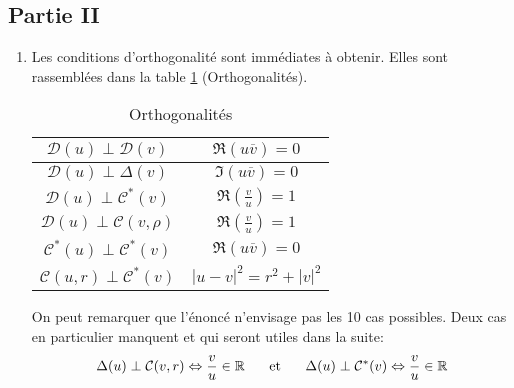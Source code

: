 \subsection*{Partie II}
\begin{enumerate}
 \item Les conditions d'orthogonalité sont immédiates à obtenir. Elles sont rassemblées dans la table \ref{tab:orthog} (Orthogonalités).
\begin{table}[h]
 \centering
 \renewcommand{\arraystretch}{2.2}
 \begin{tabular}{|c|c|}
\hline
 $\mathcal D(u) \perp \mathcal D(v)$      & $\Re\left(u\overline{v}\right)=0$ \\ \hline
 $\mathcal D(u) \perp \Delta(v)$          & $\Im \left( u\overline{v}\right) =0$ \\ \hline
 $\mathcal D(u) \perp \mathcal C^*(v)$    & $\Re\left(\frac{v}{u}\right) =1$ \\ \hline
 $\mathcal D(u) \perp \mathcal C(v,\rho)$ & $\Re\left(\frac{v}{u}\right) =1$ \\ \hline
 $\mathcal C^*(u) \perp \mathcal C^*(v)$  & $\Re \left( u\overline{v}\right) =0$\\ \hline
 $\mathcal C(u,r) \perp \mathcal C^*(v)$  & $ |u-v|^2 = r^2 +|v|^2$ \\
\hline
\end{tabular}
 \caption{Orthogonalités}
 \label{tab:orthog}
\end{table}
On peut remarquer que l'énoncé n'envisage pas les 10 cas possibles. Deux cas en particulier manquent et qui seront utiles dans la suite:
\begin{displaymath}
  \Delta(u) \perp \mathcal C(v,r) \Leftrightarrow \frac{v}{u} \in \mathbb{R} \hspace{0.5cm}\text{ et }\hspace{0.5cm}
  \Delta(u) \perp \mathcal C^*(v) \Leftrightarrow \frac{v}{u} \in \mathbb{R} 
\end{displaymath}


\end{enumerate}
